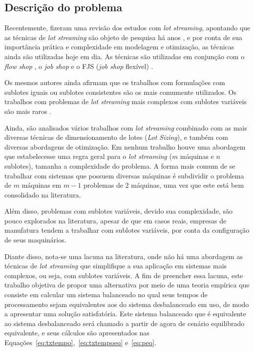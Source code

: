 \subsection{Descrição do problema} \label{subsec:descricao}
Recentemente,  fizeram uma revisão dos estudos com \textit{lot streaming}, apontando que as técnicas de \textit{lot streaming} são objeto de pesquisa há anos \cite{Potts1989, R.Baker1990475, Baker1993}, e por conta de sua importância prática e complexidade em modelagem e otimização, as técnicas ainda são utilizadas hoje em dia. As técnicas são utilizadas em conjunção com o \textit{flow shop} \cite{Potts1989, Liu2003, Biskup2006, Tseng2008, SancarEdis2009, Defersha2010, Defersha2012, Ventura2013, Mortezaei2014}, o \textit{job shop} \cite{Low2004773, Chan2008321, Petrovic2008275,SancarEdis2009442, Lei20134930} e o FJS (\textit{job shop} flexível) \cite{Bai2009, Defersha20122331, Calleja201493, Demir20143905, Rohaninejad2015, Bozek201621}. 

Os mesmos autores ainda afirmam que os trabalhos com formulações com sublotes iguais \cite{Potts1989, Chan2004472, Chan2008321, Low2004773, Tseng2008, SancarEdis2009442, Pan2012166, Ventura2013, Calleja201493} ou sublotes consistentes \cite{Potts1989, Low2004773, Chan2008321, SancarEdis2009, Bai2009, Defersha2012, Lei20134930, Demir20143905} são os mais comumente utilizados. Os trabalhos com problemas de \textit{lot streaming} mais complexos com sublotes variáveis são mais raros \cite{Liu2003, Biskup2006, Petrovic2008275, Defersha2010, Mortezaei2014}. 

Ainda, são analisados vários trabalhos com \textit{lot streaming} combinado com as mais diversas técnicas de dimensionamento de lotes (\textit{Lot Sizing}), e também com diversas abordagens de otimização. Em nenhum trabalho houve uma abordagem que estabelecesse uma regra geral para o \textit{lot streaming} ($m$ máquinas e $n$ sublotes), tamanha a complexidade do problema. A forma mais comum de se trabalhar com sistemas que possuem diversas máquinas é subdividir o problema de $m$ máquinas em $m-1$ problemas de 2 máquinas, uma vez que este está bem consolidado na literatura.

Além disso, problemas com sublotes variáveis, devido sua complexidade, são pouco explorados na literatura, apesar de que em casos reais, empresas de manufatura tendem a trabalhar com sublotes variáveis, por conta da configuração de seus maquinários. 

Diante disso, nota-se uma lacuna na literatura, onde não há uma abordagem as técnicas de \textit{lot streaming} que simplifique a sua aplicação em sistemas mais complexos, ou seja, com sublotes variáveis. A fim de preencher essa lacuna, este trabalho objetiva de propor uma alternativa por meio de uma teoria empírica que consiste em calcular um sistema balanceado no qual seus tempos de processamento sejam equivalentes aos do sistema desbalanceado em uso, de modo a apresentar uma solução satisfatória. Este sistema balanceado que é equivalente ao sistema desbalanceado será chamado a partir de agora de cenário equilibrado equivalente, e seus cálculos são apresentados nas Equações~\ref{eq:txtempo},~\ref{eq:txtempoeq} e~\ref{eq:peq}.

